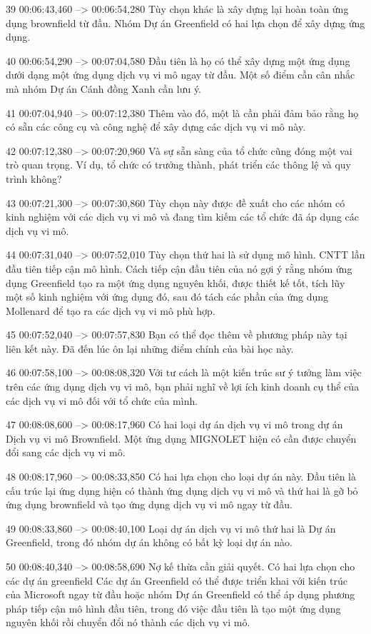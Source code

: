 39
00:06:43,460 --> 00:06:54,280
Tùy chọn khác là xây dựng lại hoàn toàn ứng dụng brownfield từ đầu.  Nhóm Dự án Greenfield có hai lựa chọn để xây dựng ứng dụng.

40
00:06:54,290 --> 00:07:04,580
Đầu tiên là họ có thể xây dựng một ứng dụng dưới dạng một ứng dụng dịch vụ vi mô ngay từ đầu.  Một số điểm cần cân nhắc mà nhóm Dự án Cánh đồng Xanh cần lưu ý.

41
00:07:04,940 --> 00:07:12,380
Thêm vào đó, một là cần phải đảm bảo rằng họ có sẵn các công cụ và công nghệ để xây dựng các dịch vụ vi mô này.

42
00:07:12,380 --> 00:07:20,960
Và sự sẵn sàng của tổ chức cũng đóng một vai trò quan trọng.  Ví dụ, tổ chức có trưởng thành, phát triển các thông lệ và quy trình không?

43
00:07:21,300 --> 00:07:30,860
Tùy chọn này được đề xuất cho các nhóm có kinh nghiệm với các dịch vụ vi mô và đang tìm kiếm các tổ chức đã áp dụng các dịch vụ vi mô.

44
00:07:31,040 --> 00:07:52,010
Tùy chọn thứ hai là sử dụng mô hình.  CNTT lần đầu tiên tiếp cận mô hình.  Cách tiếp cận đầu tiên của nó gợi ý rằng nhóm ứng dụng Greenfield tạo ra một ứng dụng nguyên khối, được thiết kế tốt, tích lũy một số kinh nghiệm với ứng dụng đó, sau đó tách các phần của ứng dụng Mollenard để tạo ra các dịch vụ vi mô phù hợp.

45
00:07:52,040 --> 00:07:57,830
Bạn có thể đọc thêm về phương pháp này tại liên kết này.  Đã đến lúc ôn lại những điểm chính của bài học này.

46
00:07:58,100 --> 00:08:08,320
Với tư cách là một kiến ​​trúc sư ý tưởng làm việc trên các ứng dụng dịch vụ vi mô, bạn phải nghĩ về lợi ích kinh doanh cụ thể của các dịch vụ vi mô đối với tổ chức của mình.

47
00:08:08,600 --> 00:08:17,960
Có hai loại dự án dịch vụ vi mô trong dự án Dịch vụ vi mô Brownfield.  Một ứng dụng MIGNOLET hiện có cần được chuyển đổi sang các dịch vụ vi mô.

48
00:08:17,960 --> 00:08:33,850
Có hai lựa chọn cho loại dự án này.  Đầu tiên là cấu trúc lại ứng dụng hiện có thành ứng dụng dịch vụ vi mô và thứ hai là gỡ bỏ ứng dụng brownfield và tạo ứng dụng dịch vụ vi mô ngay từ đầu.

49
00:08:33,860 --> 00:08:40,100
Loại dự án dịch vụ vi mô thứ hai là Dự án Greenfield, trong đó nhóm dự án không có bất kỳ loại dự án nào.

50
00:08:40,340 --> 00:08:58,690
Nợ kế thừa cần giải quyết.  Có hai lựa chọn cho các dự án greenfield Các dự án Greenfield có thể được triển khai với kiến ​​trúc của Microsoft ngay từ đầu hoặc nhóm Dự án Greenfield có thể áp dụng phương pháp tiếp cận mô hình đầu tiên, trong đó việc đầu tiên là tạo một ứng dụng nguyên khối rồi chuyển đổi nó thành các dịch vụ vi mô.

